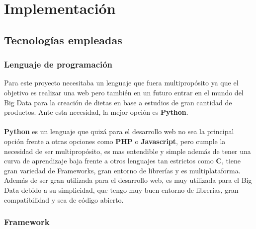 \chapter{Implementación}


\section{Tecnologías empleadas}

\subsection{Lenguaje de programación}

Para este proyecto necesitaba un lenguaje que fuera multipropósito ya que el objetivo es realizar una web pero también en un futuro entrar en el mundo del Big Data para la creación de dietas en base a estudios de gran cantidad de productos.
Ante esta necesidad, la mejor opción es \textbf{Python}.\\\\
\textbf{Python} es un lenguaje que quizá para el desarrollo web no sea la principal opción frente a otras opciones como \textbf{PHP} o \textbf{Javascript}, pero cumple 
la necesidad de ser multipropósito, es mas entendible y simple además de tener una curva de aprendizaje baja frente a otros lenguajes tan estrictos como \textbf{C}, 
tiene gran variedad de Frameworks, gran entorno de librerías y es multiplataforma.\\
Además de ser gran utilizada para el desarrollo web, es muy utilizada para el Big Data debido a su simplicidad, que tengo muy buen entorno de librerías, gran compatibilidad y sea de código abierto.

\subsection{Framework}


